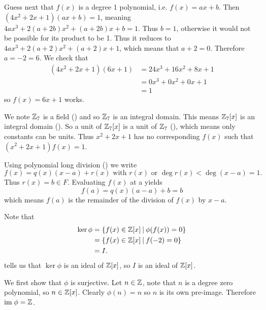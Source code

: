 \begin{questions}
\begin{partquestions}{\alph*}
        Guess next that $f(x)$ is a degree 1 polynomial, i.e. $f(x) = ax + b$. Then $(4x^2+2x+1)(ax+b) = 1$, meaning $4ax^3 + 2(a+2b)x^2 + (a+2b)x + b = 1$. Thus $b = 1$, otherwise it would not be possible for its product to be 1. Thus it reduces to $4ax^3 + 2(a+2)x^2 + (a+2)x + 1$, which means that $a+2 = 0$. Therefore $a = -2 = 6$. We check that
        \begin{align*}
            (4x^2+2x+1)(6x+1) &= 24x^3 + 16x^2 + 8x + 1\\
            &= 0x^3 + 0x^2 + 0x + 1\\
            &= 1
        \end{align*}
        so $f(x) = 6x+1$ works.

        \item We note $\mathbb{Z}_7$ is a field () and so $\mathbb{Z}_7$ is an integral domain. This means $\mathbb{Z}_7[x]$ is an integral domain (). So a unit of $\mathbb{Z}_7[x]$ is a unit of $\mathbb{Z}_7$ (), which means only constants can be units. Thus $x^2 + 2x + 1$ has no corresponding $f(x)$ such that $(x^2+2x+1)f(x) = 1$.
    \end{partquestions}

    \item Using polynomial long division () we write
    \[
        f(x) = q(x)(x-a) + r(x) \text{ with } r(x) \text{ or } \deg r(x) < \deg(x-a) = 1.
    \]
    Thus $r(x) = b \in F$. Evaluating $f(x)$ at a yields
    \[
        f(a) = q(x)(a-a) + b = b
    \]
    which means $f(a)$ is the remainder of the division of $f(x)$ by $x-a$.

    \item \begin{partquestions}{\roman*}
        \item Note that
        \begin{align*}
            \ker\phi &= \{f(x) \in \Z[x] \vert \phi(f(x)) = 0\}\\
            &= \{f(x) \in \Z[x] \vert f(-2) = 0\}\\
            &= I.
        \end{align*}
         tells us that $\ker\phi$ is an ideal of $\mathbb{Z}[x]$, so $I$ is an ideal of $\mathbb{Z}[x]$.

        \item We first show that $\phi$ is surjective. Let $n \in \mathbb{Z}$, note that $n$ is a degree zero polynomial, so $n \in \mathbb{Z}[x]$. Clearly $\phi(n) = n$ so $n$ is its own pre-image. Therefore $\mathrm{im}\;\phi = \mathbb{Z}$.


\end{partquestions}
\end{questions}
